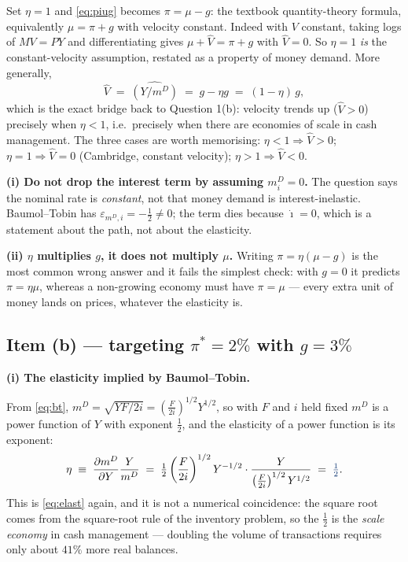 \documentclass[11pt, a4paper]{article}
\newcommand{\passo}[1]{\medskip\noindent\textbf{#1}\par\nobreak}
\newcommand{\resp}[1]{%
  \ifmmode {\color{darkblue}#1}\else\textcolor{darkblue}{\textbf{#1}}\fi}
\newcommand{\md}{m^{D}}
\begin{document}
\begin{tcolorbox}[theorybox, title={How this contains the crude quantity theory as a special case}]
\small
Set $\eta=1$ and \eqref{eq:piug} becomes $\pi=\mu-g$: the textbook quantity-theory formula,
equivalently $\mu = \pi + g$ with velocity constant. Indeed with $V$ constant, taking logs of
$MV=PY$ and differentiating gives $\mu+\hat V=\pi+g$ with $\hat V=0$. So $\eta=1$ \emph{is}
the constant-velocity assumption, restated as a property of money demand. More generally,
\begin{equation}
\hat V \;=\; \widehat{(Y/\md)} \;=\; g-\eta g \;=\; (1-\eta)\,g ,
\label{eq:vhat}
\end{equation}
which is the exact bridge back to Question 1(b): velocity trends up ($\hat V>0$) precisely
when $\eta<1$, i.e.\ precisely when there are economies of scale in cash management. The three
cases are worth memorising: $\eta<1 \Rightarrow \hat V>0$; $\eta=1 \Rightarrow \hat V=0$
(Cambridge, constant velocity); $\eta>1 \Rightarrow \hat V<0$.
\end{tcolorbox}

\begin{tcolorbox}[trapbox, title={Two traps in one line of algebra}]
\small
\textbf{(i) Do not drop the interest term by assuming $\md_i=0$.} The question says the
nominal rate is \emph{constant}, not that money demand is interest-inelastic. Baumol--Tobin
has $\varepsilon_{\md,i}=-\tfrac12\neq 0$; the term dies because $\dot\imath=0$, which is a
statement about the path, not about the elasticity.

\smallskip
\textbf{(ii) $\eta$ multiplies $g$, it does not multiply $\mu$.} Writing $\pi=\eta(\mu-g)$ is
the most common wrong answer and it fails the simplest check: with $g=0$ it predicts
$\pi=\eta\mu$, whereas a non-growing economy must have $\pi=\mu$ --- every extra unit of money
lands on prices, whatever the elasticity is.
\end{tcolorbox}

\subsection*{Item (b) --- targeting $\pi^{\ast}=2\%$ with $g=3\%$}

\passo{(i) The elasticity implied by Baumol--Tobin.}
From \eqref{eq:bt}, $\md=\sqrt{YF/2i}=\left(\tfrac{F}{2i}\right)^{1/2}Y^{1/2}$, so with $F$ and
$i$ held fixed $\md$ is a power function of $Y$ with exponent $\tfrac12$, and the elasticity of
a power function is its exponent:
\[
\eta \;\equiv\; \frac{\partial \md}{\partial Y}\frac{Y}{\md}
\;=\; \tfrac12\left(\frac{F}{2i}\right)^{1/2}Y^{-1/2}\cdot
\frac{Y}{\left(\frac{F}{2i}\right)^{1/2}Y^{1/2}}
\;=\; \resp{\tfrac12}.
\]
This is \eqref{eq:elast} again, and it is not a numerical coincidence: the square root comes
from the square-root rule of the inventory problem, so the $\tfrac12$ is the \emph{scale
economy} in cash management --- doubling the volume of transactions requires only about $41\%$
more real balances.
\end{document}
